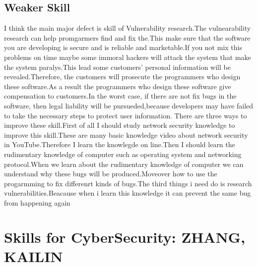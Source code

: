 \documentclass[a4paper, 11pt]{report}
\begin{document}
\subsection{Weaker Skill}
I think the main major defect is skill of Vulnerability research.The vulnearability research can help promgarmers find and fix the.This make sure that the software you are developing is secure and is reliable and marketable.If you not mix this problems on time maybe some immoral hackers will attack the system that make the system paralys.This lead some customers' personal information will be revealed.Therefore, the customers will prosecute the programmers who design these software.As a result the programmers who design these software give compensation to customers.In the worst case, if there are not fix bugs in the software, then legal liability will be pursueded,because developers may have failed to take the necessary steps to protect user information.
	There are three ways to improve these skill.First of all I should study network security knowledge to improve this skill.These are many basic knowledge video about network security in 	YouTube.Therefore I learn the knowlegde on line.Then I should learn the rudimentary knowledge of computer such as operating system
and networking protocol.When we learn about the rudimentary knowledge of computer we can understand why these bugs will be produced.Moveover how to use the progarmming to fix differenrt kinds of bugs.The third things i need do is research vulnerabilities.Beacause when i learn this knowledge it can prevent the same bug from happening again


\section{Skills for CyberSecurity: ZHANG, KAILIN}
\end{document}
